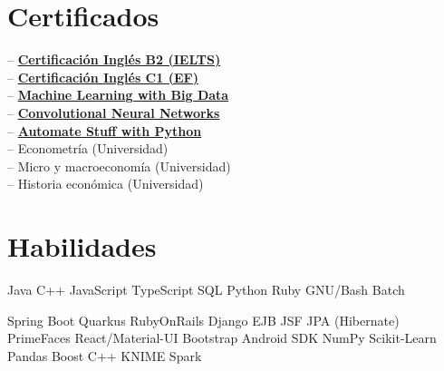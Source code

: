 \documentclass[]{CV-JuanCamiloFlorez}
\begin{document}
\begin{minipage}[t]{0.33\textwidth}
\section{Certificados}
-- \textbf{\href{https://jcamilo.co/IELTS-2022.pdf}{Certificación Inglés B2 (IELTS)}} \\
-- \textbf{\href{https://www.efset.org/cert/j8ebfw}{Certificación Inglés C1 (EF)}} \\
-- \textbf{\href{https://www.coursera.org/account/accomplishments/certificate/8MS64GGYWDT5?utm_medium=certificate&utm_source=link&utm_campaign=copybutton_certificate}{Machine Learning with Big Data}} \\
-- \textbf{\href{https://www.coursera.org/account/accomplishments/certificate/KFN2XJC2KP92?utm_medium=certificate&utm_source=link&utm_campaign=copybutton_certificate}{Convolutional Neural Networks}} \\
-- \textbf{\href{https://www.udemy.com/certificate/UC-ZHLLMBQA}{Automate Stuff with Python}} \\
-- Econometría (Universidad) \\
-- Micro y macroeconomía (Universidad) \\
-- Historia económica (Universidad) \\
\smallskip
\scriptsize{}
\sectionsep


\section{Habilidades}
    \textbullet{} Java
    \textbullet{} C++
    \textbullet{} JavaScript
    \textbullet{} TypeScript
    \textbullet{} SQL
    \textbullet{} Python
    \textbullet{} Ruby
    \textbullet{} GNU/Bash
    \textbullet{} Batch

    \textbullet{} Spring Boot
    \textbullet{} Quarkus
    \textbullet{} RubyOnRails
    \textbullet{} Django
    \textbullet{} EJB JSF JPA (Hibernate) PrimeFaces
    \textbullet{} React/Material-UI
    \textbullet{} Bootstrap
    \textbullet{} Android SDK
    \textbullet{} NumPy
    \textbullet{} Scikit-Learn
    \textbullet{} Pandas
    \textbullet{} Boost C++
    \textbullet{} KNIME
    \textbullet{} Spark


\end{minipage}
\end{document}
